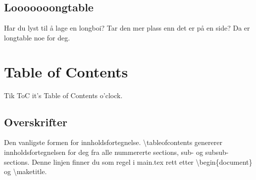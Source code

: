 
    \subsection{Looooooongtable}
        Har du lyst til å lage en longboi? Tar den mer plass enn det er på en side? Da er longtable noe for deg. 

        
    
    
\section{Table of Contents}
    Tik ToC it's Table of Contents o'clock.
    \subsection{Overskrifter}
        Den vanligste formen for innholdsfortegnelse. \textbackslash tableofcontents genererer innholdsfortegnelsen for deg fra alle nummererte sections, sub- og subsub-sections. Denne linjen finner du som regel i main.tex rett etter \textbackslash begin\{document\} og \textbackslash maketitle. 
        
